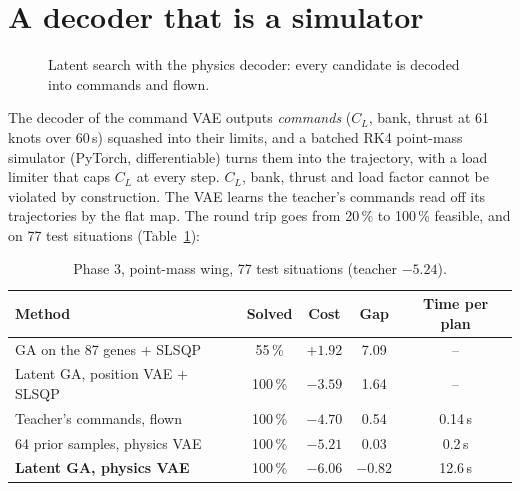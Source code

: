\documentclass[11pt,a4paper,oneside]{report}
\newcommand{\vect}[1]{\boldsymbol{#1}}
\newcommand{\R}{\mathbb{R}}
\newcommand{\CL}{C_L}
\begin{document}
\section{A decoder that is a simulator}
\begin{figure}[ht]\centering
{}
\caption{Latent search with the physics decoder: every candidate is decoded into commands and flown.}\label{fig:physdec}
\end{figure}
The decoder of the command VAE outputs \emph{commands} ($\CL$, bank, thrust at 61 knots over 60\,s) squashed into their limits, and a batched RK4 point-mass simulator (PyTorch, differentiable) turns them into the trajectory, with a load limiter that caps $\CL$ at every step. $\CL$, bank, thrust and load factor cannot be violated by construction. The VAE learns the teacher's commands read off its trajectories by the flat map. The round trip goes from 20\,\% to 100\,\% feasible, and on 77 test situations (Table~\ref{tab:physics}):

\begin{table}[ht]\centering\small
\caption{Phase 3, point-mass wing, 77 test situations (teacher $-5.24$).}\label{tab:physics}
\begin{tabular}{@{}lcccc@{}}
\toprule
Method & Solved & Cost & Gap & Time per plan \\ \midrule
GA on the 87 genes + SLSQP & 55\,\% & $+1.92$ & 7.09 & -- \\
Latent GA, position VAE + SLSQP & 100\,\% & $-3.59$ & 1.64 & -- \\
Teacher's commands, flown & 100\,\% & $-4.70$ & 0.54 & 0.14\,s \\
64 prior samples, physics VAE & 100\,\% & $-5.21$ & 0.03 & 0.2\,s \\
\textbf{Latent GA, physics VAE} & 100\,\% & $\mathbf{-6.06}$ & $\mathbf{-0.82}$ & 12.6\,s \\
\bottomrule
\end{tabular}
\end{table}
\end{document}
